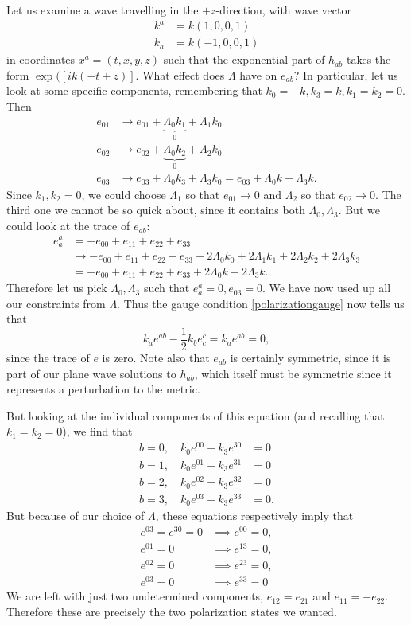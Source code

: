 Let us examine a wave travelling in the $+z$-direction, with wave vector
\begin{align*}
    k^a&= k(1,0,0,1)\\
    k_a&=k(-1,0,0,1)
\end{align*}
in coordinates $x^a=(t,x,y,z)$ such that the exponential part of $h_{ab}$ takes the form $\exp([ik(-t+z)].$ What effect does $\Lambda$ have on $e_{ab}$? In particular, let us look at some specific components, remembering that $k_0=-k, k_3=k,k_1=k_2=0$. Then
\begin{align*}
    e_{01}&\to e_{01}+\underbrace{\Lambda_0 k_1}_0 +\Lambda_1 k_0\\
    e_{02}&\to e_{02}+\underbrace{\Lambda_0 k_2}_0+\Lambda_2 k_0\\
    e_{03}&\to e_{03}+\Lambda_0 k_3 +\Lambda_3 k_0=e_{03}+\Lambda_0 k -\Lambda_3 k.
\end{align*}
Since $k_1,k_2=0$, we could choose $\Lambda_1$ so that $e_{01}\to 0$ and $\Lambda_2$ so that $e_{02}\to 0$. The third one we cannot be so quick about, since it contains both $\Lambda_0,\Lambda_3$. But we could look at the trace of $e_{ab}$:
\begin{align*}
    e^a_a &= -e_{00}+e_{11}+e_{22}+e_{33}\\
    &\to -e_{00}+e_{11}+e_{22}+e_{33} -2\Lambda_0k_0 +2\Lambda_1 k_1 +2\Lambda_2 k_2 +2\Lambda_3k_3\\
    &= -e_{00}+e_{11}+e_{22}+e_{33} + 2\Lambda_0k + 2\Lambda_3 k.
\end{align*}
Therefore let us pick $\Lambda_0,\Lambda_3$ such that $e^a_a=0, e_{03}=0.$ We have now used up all our constraints from $\Lambda$. Thus the gauge condition \ref{polarizationgauge} now tells us that
$$k_a e^{ab}-\frac{1}{2}k_b e^c_c = k_a e^{ab}=0,$$
since the trace of $e$ is zero. Note also that $e_{ab}$ is certainly symmetric, since it is part of our plane wave solutions to $h_{ab}$, which itself must be symmetric since it represents a perturbation to the metric.

But looking at the individual components of this equation (and recalling that $k_1=k_2=0$), we find that
\begin{align*}
    b=0,\quad k_0 e^{00}+k_3 e^{30}&=0\\
    b=1,\quad k_0 e^{01}+k_3 e^{31}&=0\\
    b=2,\quad k_0 e^{02}+k_3 e^{32}&=0\\
    b=3,\quad k_0 e^{03}+k_3 e^{33}&=0.
\end{align*}
But because of our choice of $\Lambda$, these equations respectively imply that
\begin{align*}
e^{03}=e^{30}=0&\implies e^{00}=0,\\
e^{01}=0 &\implies e^{13}=0,\\
e^{02}=0 &\implies e^{23}=0,\\
e^{03}=0 &\implies e^{33}=0
\end{align*}
We are left with just two undetermined components, $e_{12}=e_{21}$ and $e_{11}=-e_{22}.$ Therefore these are precisely the two polarization states we wanted.


